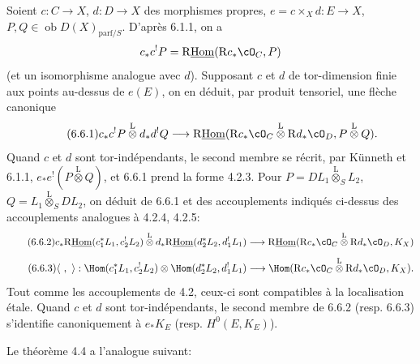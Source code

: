 Soient $c:C\to X$, $d:D\to X$ des morphismes propres, $e=c\times_Xd:E\to X$, $P,Q\in\operatorname{ob}D(X)_{\mathrm{parf}/S}$. D'après 6.1.1, on a
\[
c_*c^!P=\mathrm{R}\underline{\mathrm{Hom}}(\mathrm{R}c_*\cO_C,P)
\]
(et un isomorphisme analogue avec $d$). Supposant $c$ et $d$ de tor-dimension finie aux points au-dessus de $e(E)$, on en déduit, par produit tensoriel, une flèche canonique
\begin{equation}
\tag{6.6.1}
c_*c^!P\overset{\mathrm{L}}{\otimes}d_*d^!Q\longrightarrow
\mathrm{R}\underline{\mathrm{Hom}}(\mathrm{R}c_*\cO_C\overset{\mathrm{L}}{\otimes}\mathrm{R}d_*\cO_D,P\overset{\mathrm{L}}{\otimes}Q).
\end{equation}
Quand $c$ et $d$ sont tor-indépendants, le second membre se récrit, par Künneth et 6.1.1, $e_*e^!(P\overset{\mathrm{L}}{\otimes}Q)$, et 6.6.1 prend la forme 4.2.3. Pour $P=DL_1\overset{\mathrm{L}}{\otimes}_SL_2$, $Q=L_1\overset{\mathrm{L}}{\otimes}_SDL_2$, on déduit de 6.6.1 et des accouplements indiqués ci-dessus des accouplements analogues à 4.2.4, 4.2.5:
\begin{equation}
\tag{6.6.2}
c_*\mathrm{R}\underline{\mathrm{Hom}}(c_1^*L_1,c_2^!L_2)\overset{\mathrm{L}}{\otimes}d_*\mathrm{R}\underline{\mathrm{Hom}}(d_2^*L_2,d_1^!L_1)
\longrightarrow\mathrm{R}\underline{\mathrm{Hom}}(\mathrm{R}c_*\cO_C\overset{\mathrm{L}}{\otimes}\mathrm{R}d_*\cO_D,K_X)
\end{equation}
\begin{equation}
\tag{6.6.3}
\langle\ ,\ \rangle:\Hom(c_1^*L_1,c_2^!L_2)\otimes\Hom(d_2^*L_2,d_1^!L_1)
\longrightarrow\Hom(\mathrm{R}c_*\cO_C\overset{\mathrm{L}}{\otimes}\mathrm{R}d_*\cO_D,K_X).
\end{equation}
Tout comme les accouplements de 4.2, ceux-ci sont compatibles à la localisation étale. Quand $c$ et $d$ sont tor-indépendants, le second membre de 6.6.2 (resp. 6.6.3) s'identifie canoniquement à $e_*K_E$ (resp. $H^0(E,K_E)$).

Le théorème 4.4 a l'analogue suivant:

